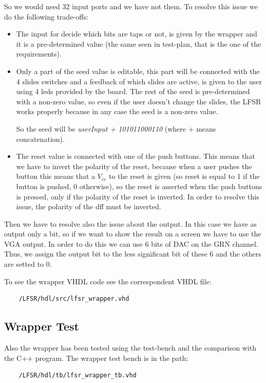 \documentclass[a4paper]{report}
\begin{document}
\noindent So we would need 32 input ports and we have not them. To resolve this issue we do the following trade-offs:
\begin{itemize}
	\item The input for decide which bits are taps or not, is given by the wrapper and it is a pre-determined value (the same seen in test-plan, that is the one of the requirements).
	\item Only a part of the seed value is editable, this part will be connected with the 4 slides switches and a feedback of which slides are active, is given to the user using 4 leds provided by the board. The rest of the seed is pre-determined with a non-zero value, so even if the user doesn't change the slides, the LFSR works properly because in any case the seed is a non-zero value.
	
	\noindent
	So the seed will be \emph{userInput + 101011000110} (where + means concatenation).
	
	\item The reset value is connected with one of the push buttons. This means that we have to invert the polarity of the reset, because when a user pushes the button this means that a $V_{cc}$ to the reset is given (so reset is equal to 1 if the button is pushed, 0 otherwise), so the reset is asserted when the push buttons is pressed, only if the polarity of the reset is inverted. In order to resolve this issue, the polarity of the dff must be inverted.
\end{itemize}

\noindent Then we have to resolve also the issue about the output. In this case we have as output only a bit, so if we want to show the result on a screen we have to use the VGA output. In order to do this we can use 6 bits of DAC on the GRN channel. Thus, we assign the output bit to the less significant bit of these 6 and the others are setted to 0.

\noindent To see the wrapper VHDL code see the correspondent VHDL file:
\begin{Verbatim}
	/LFSR/hdl/src/lfsr_wrapper.vhd
\end{Verbatim}

\subsection{Wrapper Test}
\noindent Also the wrapper has been tested using the test-bench and the comparison with the C++ program. The wrapper test bench is in the path:
\begin{Verbatim}
	/LFSR/hdl/tb/lfsr_wrapper_tb.vhd
\end{Verbatim}
\end{document}
